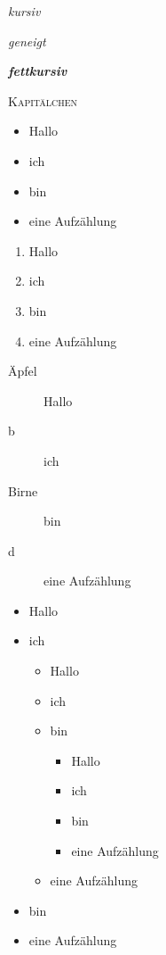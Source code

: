 \documentclass[12pt,ngerman,parskip=half]{scrreport}
\begin{document}
\textit{kursiv} %

\textsl{geneigt} %

\textbf{\textit{fettkursiv}}

\textsc{Kapitälchen} %


\begin{itemize}
\item Hallo
\item ich
\item bin
\item eine Aufzählung
\end{itemize}


\begin{enumerate}
\item Hallo
\item ich
\item bin
\item eine Aufzählung
\end{enumerate}

\begin{description}
\item [Äpfel] Hallo
\item [b] ich
\item [Birne] bin
\item [d] eine Aufzählung
\end{description}

\begin{itemize}
\item Hallo
\item ich 

\begin{itemize}
\item Hallo
\item ich
\item bin

\begin{itemize}
\item Hallo
\item ich
\item bin
\item eine Aufzählung
\end{itemize}

\item eine Aufzählung
\end{itemize}


\item bin
\item eine Aufzählung
\end{itemize}
\end{document}
